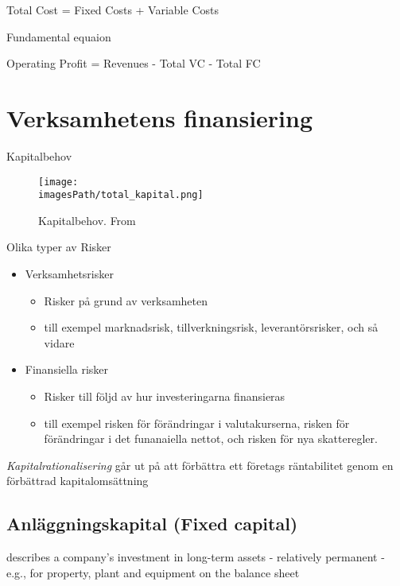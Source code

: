 \begin{center}
    Total Cost = Fixed Costs + Variable Costs
\end{center}

Fundamental equaion 
\begin{center}
    Operating Profit = Revenues - Total VC - Total FC
\end{center}

\section{Verksamhetens finansiering}
Kapitalbehov 
\begin{figure}[!ht]
    \centering
    \texttt{[image: \\imagesPath/total\_kapital.png]}
    \caption{Kapitalbehov. From \cite{}}
\end{figure}

Olika typer av Risker 
\begin{itemize}
    \item Verksamhetsrisker
    \begin{itemize}
        \item Risker på grund av verksamheten
        \item till exempel marknadsrisk, tillverkningsrisk, leverantörsrisker, och så vidare
    \end{itemize}
    \item Finansiella risker 
    \begin{itemize}
        \item Risker till följd av hur investeringarna finansieras
        \item till exempel risken för förändringar i valutakurserna, risken för förändringar i det funanaiella nettot, och risken för nya skatteregler.
    \end{itemize}
\end{itemize}

\textit{Kapitalrationalisering} går ut på att förbättra ett företags räntabilitet genom en förbättrad kapitalomsättning
\subsection{Anläggningskapital (Fixed capital)}
describes a company's investment in long-term assets - relatively permanent 
- e.g., for property, plant and equipment on the balance sheet


